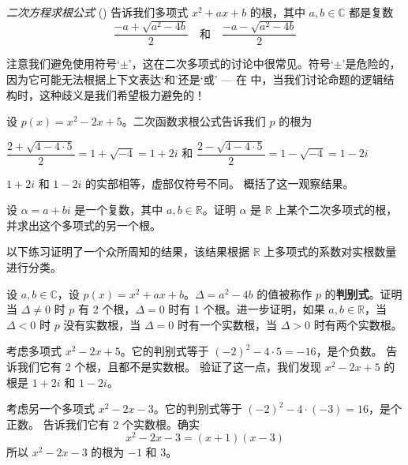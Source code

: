 \textit{二次方程求根公式} () 告诉我们多项式 $x^2+ax+b$ 的根，其中 $a,b \in \mathbb{C}$ 都是复数
\[ \frac{-a+\sqrt{a^2-4b}}{2} \quad \text{和} \quad \frac{-a-\sqrt{a^2-4b}}{2} \]

注意我们避免使用符号`$\pm$'，这在二次多项式的讨论中很常见。符号`$\pm$'是危险的，因为它可能无法根据上下文表达`和'还是`或' --- 在  中，当我们讨论命题的逻辑结构时，这种歧义是我们希望极力避免的！

\begin{example}
\label{exApplicationOfQuadraticFormula}
设 $p(x)=x^2-2x+5$。二次函数求根公式告诉我们 $p$ 的根为
\begin{center}
$\dfrac{2 + \sqrt{4 - 4 \cdot 5}}{2} = 1 + \sqrt{-4} = 1+2i$
\quad 和 \quad
$\dfrac{2 - \sqrt{4 - 4 \cdot 5}}{2} = 1-\sqrt{-4} = 1-2i$
\end{center}
$1+2i$ 和 $1-2i$ 的实部相等，虚部仅符号不同。 概括了这一观察结果。
\end{example}

\begin{exercise}
\label{exComplexNumberAsRootOfQuadraticOverR}
设 $\alpha = a+bi$ 是一个复数，其中 $a,b \in \mathbb{R}$。证明 $\alpha$ 是 $\mathbb{R}$ 上某个二次多项式的根，并求出这个多项式的另一个根。
\end{exercise}

以下练习证明了一个众所周知的结果，该结果根据 $\mathbb{R}$ 上多项式的系数对实根数量进行分类。

\begin{exercise}
\label{exDiscriminantRealRoots}
设 $a,b \in \mathbb{C}$，设 $p(x)=x^2+ax+b$。$\Delta=a^2-4b$ 的值被称作 $p$ 的\textbf{判别式}。证明当 $\Delta \ne 0$ 时 $p$ 有 2 个根，$\Delta = 0$ 时有 1 个根。进一步证明，如果 $a,b \in \mathbb{R}$，当 $\Delta < 0$ 时 $p$ 没有实数根，当 $\Delta = 0$ 时有一个实数根，当 $\Delta > 0$ 时有两个实数根。
\end{exercise}

\begin{example}
考虑多项式 $x^2-2x+5$。它的判别式等于 $(-2)^2-4 \cdot 5 = -16$，是个负数。 告诉我们它有 2 个根，且都不是实数根。 验证了这一点，我们发现 $x^2-2x+5$ 的根是 $1+2i$ 和 $1-2i$。

考虑另一个多项式 $x^2-2x-3$。它的判别式等于 $(-2)^2-4\cdot(-3) = 16$，是个正数。 告诉我们它有 2 个实数根。确实
\[ x^2-2x-3 = (x+1)(x-3) \]
所以 $x^2-2x-3$ 的根为 $-1$ 和 $3$。
\end{example}